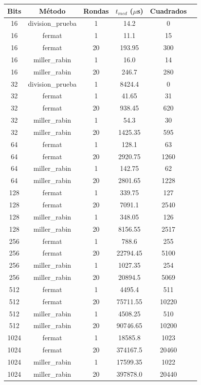 \begin{tabular}{cccccc}
\toprule
Bits & Método & Rondas & $t_{med}$ ($\mu$s) & Cuadrados \\
\midrule
16 & division_prueba & 1 & 14.2 & 0 \\
16 & fermat & 1 & 11.1 & 15 \\
16 & fermat & 20 & 193.95 & 300 \\
16 & miller_rabin & 1 & 16.0 & 14 \\
16 & miller_rabin & 20 & 246.7 & 280 \\
32 & division_prueba & 1 & 8424.4 & 0 \\
32 & fermat & 1 & 41.65 & 31 \\
32 & fermat & 20 & 938.45 & 620 \\
32 & miller_rabin & 1 & 54.3 & 30 \\
32 & miller_rabin & 20 & 1425.35 & 595 \\
64 & fermat & 1 & 128.1 & 63 \\
64 & fermat & 20 & 2920.75 & 1260 \\
64 & miller_rabin & 1 & 142.75 & 62 \\
64 & miller_rabin & 20 & 2801.65 & 1228 \\
128 & fermat & 1 & 339.75 & 127 \\
128 & fermat & 20 & 7091.1 & 2540 \\
128 & miller_rabin & 1 & 348.05 & 126 \\
128 & miller_rabin & 20 & 8156.55 & 2517 \\
256 & fermat & 1 & 788.6 & 255 \\
256 & fermat & 20 & 22794.45 & 5100 \\
256 & miller_rabin & 1 & 1027.35 & 254 \\
256 & miller_rabin & 20 & 20894.5 & 5069 \\
512 & fermat & 1 & 4495.4 & 511 \\
512 & fermat & 20 & 75711.55 & 10220 \\
512 & miller_rabin & 1 & 4508.25 & 510 \\
512 & miller_rabin & 20 & 90746.65 & 10200 \\
1024 & fermat & 1 & 18585.8 & 1023 \\
1024 & fermat & 20 & 374167.5 & 20460 \\
1024 & miller_rabin & 1 & 17599.35 & 1022 \\
1024 & miller_rabin & 20 & 397878.0 & 20440 \\
\bottomrule
\end{tabular}
